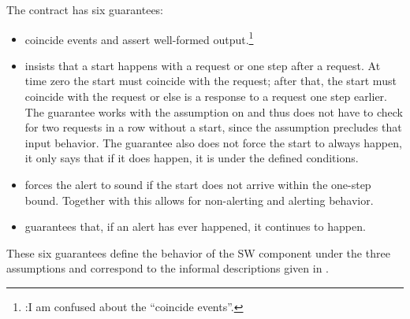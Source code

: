 The contract has six guarantees:
\begin{itemize}
\item {}
coincide events and assert well-formed output.\footnote{:I am confused about the ``coincide events''.}
\item {} insists that a start happens with a request or one step after a request. At time zero the start must coincide
with the request; after that, the start must coincide with the request
or else is a response to a request one step earlier.  The guarantee
works with the assumption on  and thus does
not have to check for two requests in a row without a start, since the
assumption precludes that input behavior. The guarantee also does not
force the start to always happen, it only says that if it does happen,
it is under the defined conditions.

\item {} forces the alert to sound if the start does not arrive within the one-step bound. Together with  this allows
for non-alerting and alerting behavior.
\item {} guarantees that, if an alert has ever happened,
it continues to happen.
\end{itemize}
These six guarantees define the behavior of the SW component under the
three assumptions and correspond to the informal descriptions given
in .
